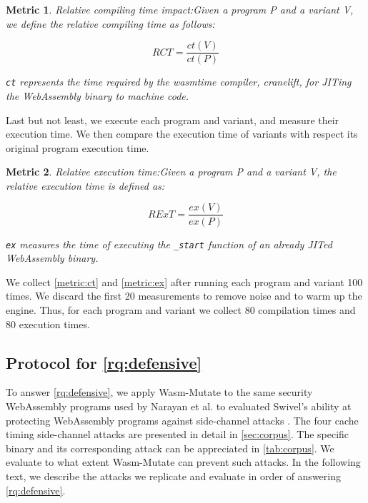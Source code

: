 \documentclass[a4paper,fleqn]{cas-dc}
\newcommand{\tool}{{\sc Wasm-Mutate}\xspace}
\newcommand{\Wasm}{WebAssembly\xspace}
\newcommand{\wasm}{\Wasm}
\newtheorem{metric}{Metric}
\newenvironment{revision1}{\color{blue}}{}
\begin{document}
\begin{revision1}
\begin{metric}{Relative compiling time impact:}\label{metric:ct}
Given a program P and a variant V, we define the relative compiling time as follows:

$$
    RCT=\frac{ct(V)}{ct(P)}
$$

\texttt{ct} represents the time required by the wasmtime compiler, cranelift, for JITing the \Wasm binary to machine code.

\end{metric}

Last but not least, we execute each program and variant, and measure their execution time. 
We then compare the execution time of variants with respect its original program execution time.

\begin{metric}{Relative execution time:}\label{metric:ex}
Given a program P and a variant V, the relative execution time is defined as:

$$
    RExT=\frac{ex(V)}{ex(P)}
$$

\texttt{ex} measures the time of executing the \texttt{_start} function of an already JITed \Wasm binary.
\end{metric}

We collect \autoref{metric:ct} and \autoref{metric:ex} after running each program and variant 100 times.
We discard the first 20 measurements to remove noise and to warm up the engine.
Thus, for each program and variant we collect 80 compilation times and 80 execution times.
  
\end{revision1}

\subsection{Protocol for \ref{rq:defensive}}
\label{protocol:rq3}

\newcommand{\poct}{\emph{Cache timing POC}\xspace}
\newcommand{\pocd}{\emph{Differential computing POC}\xspace}
\newcommand{\pocp}{\emph{Port contention POC}\xspace}

To answer \ref{rq:defensive}, we apply \tool to the same security \wasm programs used by Narayan et al. to evaluated Swivel's ability at protecting \wasm programs against side-channel attacks \cite{Swivel}. 
The four cache timing side-channel attacks are presented in detail in \autoref{sec:corpus}. 
The specific binary and its corresponding attack can be appreciated in \autoref{tab:corpus}.
We evaluate to what extent \tool can prevent such attacks.
In the following text, we describe the attacks we replicate and evaluate in order of answering \ref{rq:defensive}.
\end{document}
